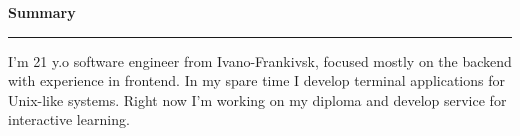 {
    {\vspace{1cm} \hspace{-1cm} \Large \textbf{Summary}}
    \par\noindent\rule{\textwidth}{0.1mm}

    {\vspace{0.5cm}}
    I'm 21 y.o software engineer from Ivano-Frankivsk, focused mostly on the backend with experience in frontend.
    In my spare time I develop terminal applications for Unix-like systems.
    Right now I'm working on my diploma and develop service for interactive learning.
    \bigbreak
}